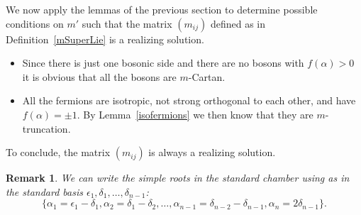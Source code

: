 \documentclass[10pt,a4paper]{amsart}
\numberwithin{equation}{section}
\newtheorem{oss}[teo]{Remark} }
\begin{document}
We now apply the lemmas of the previous section to determine possible conditions on $m'$ such that the matrix $(m_{ij})$ defined as in Definition~\ref{mSuperLie} is a realizing solution.
\begin{itemize}\itemsep=0pt
	\item Since there is just one bosonic side and there are no bosons with $f(\alpha)>0$ it is obvious that all the bosons are $m$-Cartan.
	\item All the fermions are isotropic, not strong orthogonal to each other, and have $f(\alpha)= \pm 1$. By Lemma~\ref{isofermions} we then know that they are $m$-truncation.
\end{itemize}
To conclude, the matrix $(m_{ij})$ is always a realizing solution.

\begin{oss} We can write the simple roots in the standard chamber using as in \cite{Kac77} the standard basis $\epsilon_1, \delta_ 1, \dots, \delta_{n-1}$:
\[  \lbrace \alpha_1 = \epsilon_1-\delta_1,  \alpha_2= \delta_1-\delta_2, \dots, \alpha_{n-1}=\delta_{n-2}-\delta_{n-1},  \alpha_n= 2\delta_{n-1} \rbrace. \]
\end{oss}
\end{document}
